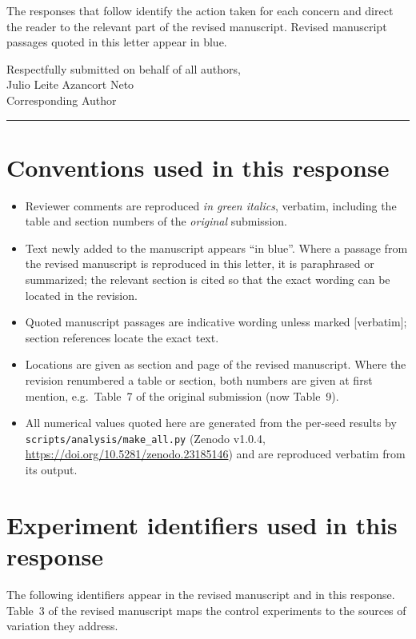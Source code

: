 \documentclass[11pt,a4paper]{article}
\newcommand{\newtext}[1]{\textcolor{chgcolor}{``#1''}}
\newcommand{\renum}[2]{#1 of the original submission (now #2)}
\begin{document}
The responses that follow identify the action taken for each concern and
direct the reader to the relevant part of the revised manuscript. Revised
manuscript passages quoted in this letter appear in
\textcolor{chgcolor}{blue}.

\bigskip
\noindent
Respectfully submitted on behalf of all authors,\\[6pt]
Julio Leite Azancort Neto\\
Corresponding Author

\medskip\noindent\rule{\linewidth}{0.4pt}\medskip

\section*{Conventions used in this response}

\begin{itemize}[leftmargin=1.2em,itemsep=0.35em]
\item Reviewer comments are reproduced \textcolor{rccolor}{\itshape in
      green italics}, verbatim, including the table and section numbers
      of the \emph{original} submission.
\item Text newly added to the manuscript appears \newtext{in blue}.
      Where a passage from the revised manuscript is reproduced in this
      letter, it is paraphrased or summarized; the relevant section is
      cited so that the exact wording can be located in the revision.
\item Quoted manuscript passages are indicative wording unless marked
      {[verbatim]}; section references locate the exact text.
\item Locations are given as section and page of the revised manuscript.
      Where the revision renumbered a table or section, both numbers are
      given at first mention, e.g.\ \renum{Table~7}{Table~9}.
\item All numerical values quoted here are generated from the per-seed
      results by \texttt{scripts/analysis/make\_all.py} (Zenodo v1.0.4,
      \url{https://doi.org/10.5281/zenodo.23185146}) and are
      reproduced verbatim from its output.
\end{itemize}

\section*{Experiment identifiers used in this response}

\noindent
The following identifiers appear in the revised manuscript and in this
response. Table~3 of the revised manuscript maps the control experiments
to the sources of variation they address.
\end{document}
